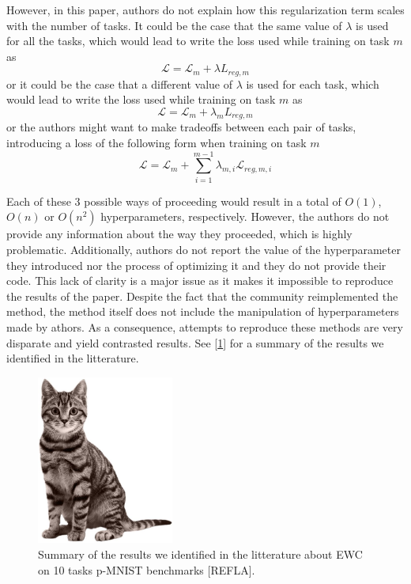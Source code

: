\documentclass[11pt]{article}
\begin{document}
\vspace{2mm}
\noindent
However, in this paper, authors do not explain how this regularization term scales with the number of tasks. It could be the case that the same value of $\lambda$ is used for all the tasks, which would lead to write the loss used while training on task $m$ as 
\begin{equation}
    \mathcal{L} = \mathcal{L}_{m} + \lambda{L}_{reg,m}
\end{equation}
or it could be the case that a different value of $\lambda$ is used for each task, which would lead to write the loss used while training on task $m$ as
\begin{equation}
    \mathcal{L} = \mathcal{L}_{m} + \lambda_{m}{L}_{reg,m}
\end{equation}
or the authors might want to make tradeoffs between each pair of tasks, introducing a loss of the following form when training on task $m$
\begin{equation}
    \mathcal{L} = \mathcal{L}_{m} + \sum_{i=1}^{m-1}\lambda_{m,i}\mathcal{L}_{reg,m,i}
\end{equation}

\vspace{2mm}
\noindent
Each of these $3$ possible ways of proceeding would result in a total of $O(1)$, $O(n)$ or $O(n^2)$ hyperparameters, respectively. However, the authors do not provide any information about the way they proceeded, which is highly problematic. Additionally, authors do not report the value of the hyperparameter they introduced nor the process of optimizing it and they do not provide their code. This lack of clarity is a major issue as it makes it impossible to reproduce the results of the paper. Despite the fact that the community reimplemented the method, the method itself does not include the manipulation of hyperparameters made by athors. As a consequence, attempts to reproduce these methods are very disparate and yield contrasted results. See [\ref{fig:EWCs}] for a summary of the results we identified in the litterature.

\begin{figure}
    \centering
    \includegraphics[width=0.40\textwidth]{images/cat.jpg}
    \caption{Summary of the results we identified in the litterature about EWC on 10 tasks p-MNIST benchmarks [REFLA].}
    \label{fig:EWCs}
\end{figure}
\end{document}

